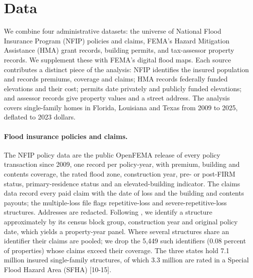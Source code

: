 
\section{Data}

We combine four administrative datasets: the universe of National Flood Insurance Program
(NFIP) policies and claims, FEMA's Hazard Mitigation Assistance (HMA) grant records, building
permits, and tax-assessor property records. We supplement these with FEMA's digital flood maps.
Each source contributes a distinct piece of the analysis: NFIP identifies the insured population
and records premiums, coverage and claims; HMA records federally funded elevations and their
cost; permits date privately and publicly funded elevations; and assessor records give property
values and a street address. The analysis covers single-family homes in Florida, Louisiana and
Texas from 2009 to 2025, deflated to 2023 dollars.

\paragraph{Flood insurance policies and claims.}
The NFIP policy data are the public OpenFEMA release of every policy transaction since 2009,
one record per policy-year, with premium, building and contents coverage, the rated flood zone,
construction year, pre- or post-FIRM status, primary-residence status and an elevated-building
indicator. The claims data record every paid claim with the date of loss and the building and
contents payouts; the multiple-loss file flags repetitive-loss and severe-repetitive-loss
structures. Addresses are redacted. Following \citet{wagner2022}, we identify a structure
approximately by its census block group, construction year and original policy date, which
yields a property-year panel. Where several structures share an identifier their claims are
pooled; we drop the 5,449 such identifiers (0.08 percent of properties) whose claims exceed
their coverage. The three states hold 7.1 million insured single-family structures, of which
3.3 million are rated in a Special Flood Hazard Area (SFHA) [10-15].

